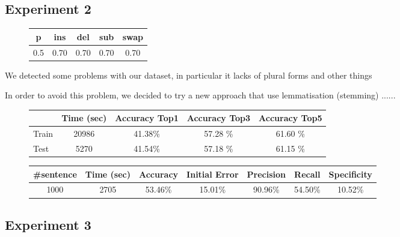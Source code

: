 \subsection{Experiment 2}
\begin{figure}[H]
	\centering
	\begin{tabular}{ccccc}
		\toprule
		p 				 & ins 				 	& del  				&  sub 			   &   swap\\ \midrule
		\num{0.5} & \num{0,70} & \num{0,70}  & \num{0,70} & \num{0,70}\\
		\bottomrule
	\end{tabular}
	\label{tab:error_model2}
\end{figure}

We detected some problems with our dataset, in particular it lacks of plural forms and other things

In order to avoid this problem, we decided to try a new approach that use lemmatisation (stemming) ......

\begin{figure}[H]
	\centering
	\begin{tabular}{lcccc}
		\toprule
		& Time (sec)  & Accuracy Top1 & Accuracy Top3  &  Accuracy Top5 \\
		\midrule
		Train & \num{20986} & \num{41,38}\%  & \num{57,28} \% & \num{61,60} \% \\
		Test &	\num{5270}  & \num{41,54}\%  & \num{57,18} \% & \num{61,15} \%  \\
		\bottomrule
	\end{tabular}
	\label{tab:typo-eval2}
\end{figure}


\begin{figure}[H]
	\centering
	\begin{tabular}{ccccccc}
		\toprule
		\#sentence & Time (sec)  & Accuracy & Initial Error  &  Precision & Recall & Specificity \\
		\midrule
		\num{1000}	& \num{2705}  & \num{53,46}\%  & \num{15,01}\% & \num{90,96}\% & \num{54,50}\%  & 
		\num{10,52}\%  
		\\
		\bottomrule
	\end{tabular}
	\label{tab:sentence-eval2}
\end{figure}

\subsection{Experiment 3}


